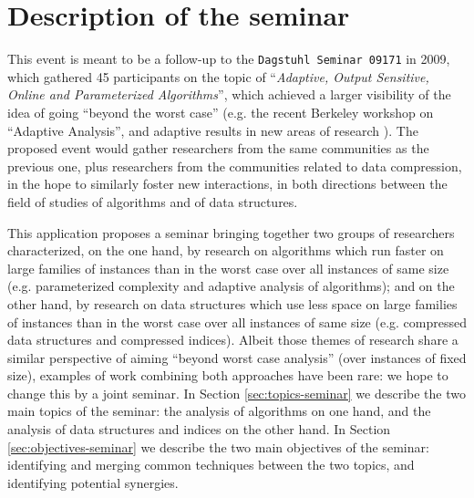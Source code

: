 \documentclass[a4paper,10pt]{article}
\begin{document}


\section{Description of the seminar}

\begin{INUTILE}
This event is meant to be a follow-up to the \texttt{Dagstuhl Seminar 09171} in 2009, which gathered 45 participants on the topic of ``\emph{Adaptive, Output Sensitive, Online and Parameterized Algorithms}'', which achieved a larger visibility of the idea of going ``beyond the worst case'' (e.g. the recent Berkeley workshop on ``Adaptive Analysis'', and adaptive results in new areas of research \cite{2015-SPIRE-AdaptiveComputationOfTheSwapInsertCorrectionDistance-BarbayPerez}). The proposed event would gather researchers from the same communities as the previous one, plus researchers from the communities related to data compression, in the hope to similarly foster new interactions, in both directions between the field of studies of algorithms and of data structures.
\end{INUTILE}

This application proposes a seminar bringing together two groups of researchers characterized, on the one hand, by research on algorithms which run faster on large families of instances than in the worst case over all instances of same size  (e.g. parameterized complexity and adaptive analysis of algorithms); and on the other hand, by research on data structures which use less space on large families of instances than in the worst case over all instances of same size (e.g. compressed data structures and compressed indices). 
%
Albeit those themes of research share a similar perspective of aiming ``beyond worst case analysis'' (over instances of fixed size), examples of work combining both approaches have been rare: we hope to change this by a joint seminar.  
%
In Section \ref{sec:topics-seminar} we describe the two main topics of the seminar: the analysis of algorithms on one hand, and the analysis of data structures and indices on the other hand. In Section \ref{sec:objectives-seminar} we describe the two main objectives of the seminar: identifying and merging common techniques between the two topics, and identifying potential synergies.
\end{document}
